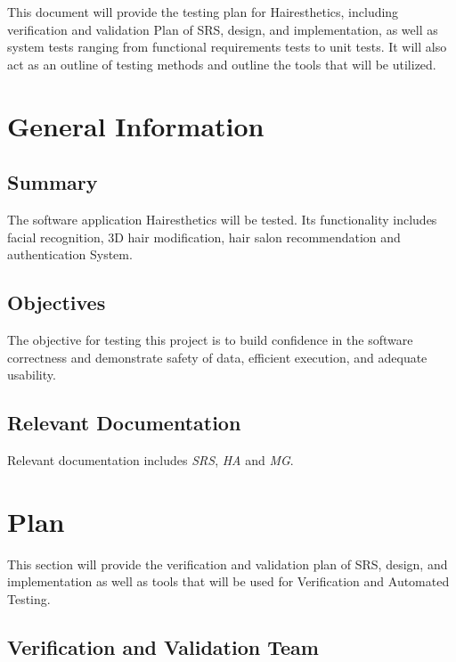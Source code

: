 \documentclass[12pt, titlepage]{article}
\begin{document}
\newpage


This document will provide the testing plan for Hairesthetics, including verification and validation Plan of SRS, design, and implementation, as well as system tests ranging from functional requirements tests to unit tests. It will also act as an outline of testing methods and outline the tools that will be utilized.

\section{General Information}

\subsection{Summary}


  The software application Hairesthetics will be tested. Its functionality includes facial recognition, 3D hair modification, hair salon recommendation and authentication System.

\subsection{Objectives}

The objective for testing this project is to build confidence in the software correctness and demonstrate
safety of data, efficient execution, and adequate usability. 

\subsection{Relevant Documentation}

Relevant documentation includes \textit{SRS}, \textit{HA} and \textit{MG}.

\section{Plan}

This section will provide the verification and validation plan of SRS, design, and implementation as well as tools that will be used for Verification and Automated Testing.
  

\subsection{Verification and Validation Team}
\end{document}
